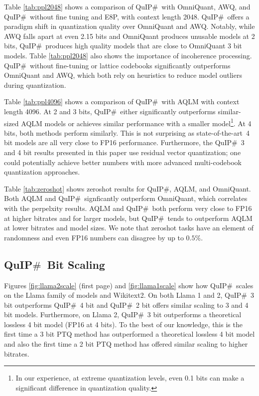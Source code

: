 Table \ref{tab:ppl2048} shows a comparison of QuIP$\#$\  with OmniQuant, AWQ, and QuIP$\#$\  without fine tuning and E8P, with context length 2048.
QuIP$\#$\  offers a paradigm shift in quantization quality over OmniQuant and AWQ. Notably, while AWQ falls apart at even 2.15 bits \cite{omniquant} and OmniQuant produces unusable models at 2 bits, QuIP$\#$\  produces high quality models that are close to OmniQuant 3 bit models. Table \ref{tab:ppl2048} also shows the importance of incoherence processing.
QuIP$\#$\  without fine-tuning or lattice codebooks significantly outperforms OmniQuant and AWQ, which both rely on heuristics to reduce model outliers during quantization. 

Table \ref{tab:ppl4096} shows a comparison of QuIP$\#$\  with AQLM with context length 4096. At 2 and 3 bits, QuIP$\#$\  either significantly outperforms similar-sized AQLM models or achieves similar performance with a smaller model\footnote{In our experience, at extreme quantization levels, even 0.1 bits can make a significant difference in quantization quality.}. At 4 bits, both methods perform similarly. This is not surprising as state-of-the-art\  4 bit models are all very close to FP16 performance. Furthermore, the QuIP$\#$\  3 and 4 bit results presented in this paper use residual vector quantization; one could potentially achieve better numbers with more advanced multi-codebook quantization approaches.

Table \ref{tab:zeroshot} shows zeroshot results for QuIP$\#$, AQLM, and OmniQuant. Both AQLM and QuIP$\#$\  signficantly outperform OmniQuant, which correlates with the perpelxity results. AQLM and QuIP$\#$\  both perform very close to FP16 at higher bitrates and for larger models, but QuIP$\#$\  tends to outperform AQLM at lower bitrates and model sizes. We note that zeroshot tasks have an element of randomness and even FP16 numbers can disagree by up to $0.5\%$.

\subsection{QuIP$\#$\  Bit Scaling}

Figures \ref{fig:llama2scale} (first page) and \ref{fig:llama1scale} show how QuIP$\#$\  scales on the Llama family of models and Wikitext2. On both Llama 1 and 2, QuIP$\#$\  3 bit outperforms QuIP$\#$\  4 bit and QuIP$\#$\  2 bit offers similar scaling to 3 and 4 bit models. Furthermore, on Llama 2, QuIP$\#$\  3 bit outperforms a theoretical lossless 4 bit model (FP16 at 4 bits). To the best of our knowledge, this is the first time a 3 bit PTQ method has outperformed a theoretical lossless 4 bit model and also the first time a 2 bit PTQ method has offered similar scaling to higher bitrates.

